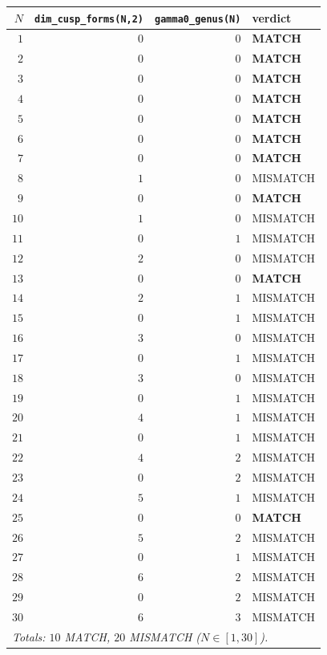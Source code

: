 \documentclass[11pt,a4paper]{article}
\theoremstyle{definition}
\begin{document}
\begin{center}
\begin{longtable}{rrrl}
\toprule
$N$ & \texttt{dim\_cusp\_forms(N,2)} & \texttt{gamma0\_genus(N)} & verdict \\
\midrule
\endhead
$1$  & $0$ & $0$ & \textbf{MATCH} \\
$2$  & $0$ & $0$ & \textbf{MATCH} \\
$3$  & $0$ & $0$ & \textbf{MATCH} \\
$4$  & $0$ & $0$ & \textbf{MATCH} \\
$5$  & $0$ & $0$ & \textbf{MATCH} \\
$6$  & $0$ & $0$ & \textbf{MATCH} \\
$7$  & $0$ & $0$ & \textbf{MATCH} \\
$8$  & $1$ & $0$ & MISMATCH \\
$9$  & $0$ & $0$ & \textbf{MATCH} \\
$10$ & $1$ & $0$ & MISMATCH \\
$11$ & $0$ & $1$ & MISMATCH \\
$12$ & $2$ & $0$ & MISMATCH \\
$13$ & $0$ & $0$ & \textbf{MATCH} \\
$14$ & $2$ & $1$ & MISMATCH \\
$15$ & $0$ & $1$ & MISMATCH \\
$16$ & $3$ & $0$ & MISMATCH \\
$17$ & $0$ & $1$ & MISMATCH \\
$18$ & $3$ & $0$ & MISMATCH \\
$19$ & $0$ & $1$ & MISMATCH \\
$20$ & $4$ & $1$ & MISMATCH \\
$21$ & $0$ & $1$ & MISMATCH \\
$22$ & $4$ & $2$ & MISMATCH \\
$23$ & $0$ & $2$ & MISMATCH \\
$24$ & $5$ & $1$ & MISMATCH \\
$25$ & $0$ & $0$ & \textbf{MATCH} \\
$26$ & $5$ & $2$ & MISMATCH \\
$27$ & $0$ & $1$ & MISMATCH \\
$28$ & $6$ & $2$ & MISMATCH \\
$29$ & $0$ & $2$ & MISMATCH \\
$30$ & $6$ & $3$ & MISMATCH \\
\midrule
\multicolumn{4}{l}{\emph{Totals: $10$ MATCH, $20$ MISMATCH ($N\in[1,30]$).}}\\
\bottomrule
\end{longtable}
\end{center}
\end{document}

